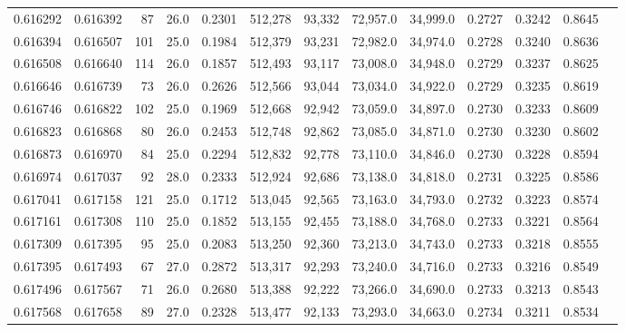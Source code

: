 \begin{tabular}{rrrrrrrrrrrrr}
0.616292 & 0.616392 &    87 & 26.0 &                                     0.2301 & 512,278 &  93,332 &  72,957.0 &  34,999.0 & 0.2727 & 0.3242 & 0.8645 \\
0.616394 & 0.616507 &   101 & 25.0 &                                     0.1984 & 512,379 &  93,231 &  72,982.0 &  34,974.0 & 0.2728 & 0.3240 & 0.8636 \\
0.616508 & 0.616640 &   114 & 26.0 &                                     0.1857 & 512,493 &  93,117 &  73,008.0 &  34,948.0 & 0.2729 & 0.3237 & 0.8625 \\
0.616646 & 0.616739 &    73 & 26.0 &                                     0.2626 & 512,566 &  93,044 &  73,034.0 &  34,922.0 & 0.2729 & 0.3235 & 0.8619 \\
0.616746 & 0.616822 &   102 & 25.0 &                                     0.1969 & 512,668 &  92,942 &  73,059.0 &  34,897.0 & 0.2730 & 0.3233 & 0.8609 \\
0.616823 & 0.616868 &    80 & 26.0 &                                     0.2453 & 512,748 &  92,862 &  73,085.0 &  34,871.0 & 0.2730 & 0.3230 & 0.8602 \\
0.616873 & 0.616970 &    84 & 25.0 &                                     0.2294 & 512,832 &  92,778 &  73,110.0 &  34,846.0 & 0.2730 & 0.3228 & 0.8594 \\
0.616974 & 0.617037 &    92 & 28.0 &                                     0.2333 & 512,924 &  92,686 &  73,138.0 &  34,818.0 & 0.2731 & 0.3225 & 0.8586 \\
0.617041 & 0.617158 &   121 & 25.0 &                                     0.1712 & 513,045 &  92,565 &  73,163.0 &  34,793.0 & 0.2732 & 0.3223 & 0.8574 \\
0.617161 & 0.617308 &   110 & 25.0 &                                     0.1852 & 513,155 &  92,455 &  73,188.0 &  34,768.0 & 0.2733 & 0.3221 & 0.8564 \\
0.617309 & 0.617395 &    95 & 25.0 &                                     0.2083 & 513,250 &  92,360 &  73,213.0 &  34,743.0 & 0.2733 & 0.3218 & 0.8555 \\
0.617395 & 0.617493 &    67 & 27.0 &                                     0.2872 & 513,317 &  92,293 &  73,240.0 &  34,716.0 & 0.2733 & 0.3216 & 0.8549 \\
0.617496 & 0.617567 &    71 & 26.0 &                                     0.2680 & 513,388 &  92,222 &  73,266.0 &  34,690.0 & 0.2733 & 0.3213 & 0.8543 \\
0.617568 & 0.617658 &    89 & 27.0 &                                     0.2328 & 513,477 &  92,133 &  73,293.0 &  34,663.0 & 0.2734 & 0.3211 & 0.8534 \\

\end{tabular}
